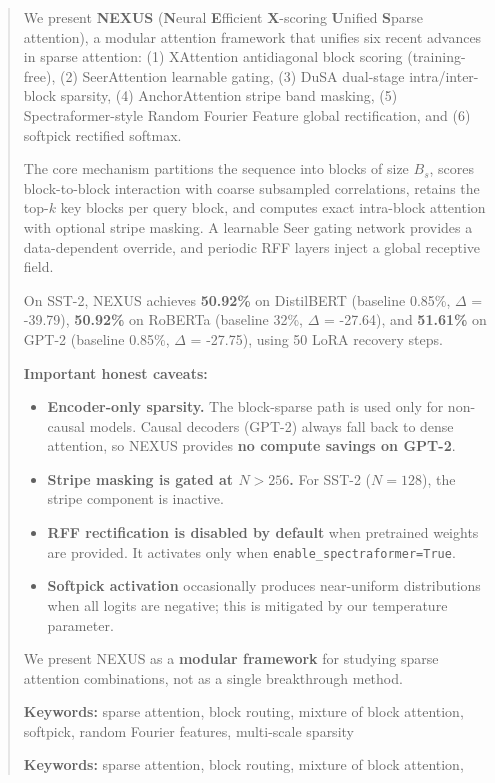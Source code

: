 \documentclass[10pt,twocolumn,letterpaper]{article}
\begin{document}
\maketitle

\begin{abstract}
We present \textbf{NEXUS} (\textbf{N}eural \textbf{E}fficient \textbf{X}-scoring \textbf{U}nified \textbf{S}parse 
attention), a modular attention framework that unifies six recent advances in 
sparse attention: (1) XAttention antidiagonal block scoring (training-free), 
(2) SeerAttention learnable gating, (3) DuSA dual-stage intra/inter-block 
sparsity, (4) AnchorAttention stripe band masking, (5) Spectraformer-style 
Random Fourier Feature global rectification, and (6) softpick rectified softmax.

The core mechanism partitions the sequence into blocks of size $B_s$, scores 
block-to-block interaction with coarse subsampled correlations, retains the 
top-$k$ key blocks per query block, and computes exact intra-block attention 
with optional stripe masking. A learnable Seer gating network provides a 
data-dependent override, and periodic RFF layers inject a global receptive 
field.

On SST-2, NEXUS achieves \textbf{50.92\%} on DistilBERT (baseline 0.85\%, 
$\Delta$ = -39.79), \textbf{50.92\%} on RoBERTa (baseline 32\%, $\Delta$ = -27.64), 
and \textbf{51.61\%} on GPT-2 (baseline 0.85\%, $\Delta$ = -27.75), using 
50 LoRA recovery steps.

\textbf{Important honest caveats:}

\begin{itemize}
\item \textbf{Encoder-only sparsity.} The block-sparse path is used only for
  non-causal models. Causal decoders (GPT-2) always fall back to dense
  attention, so NEXUS provides \textbf{no compute savings on GPT-2}.
\item \textbf{Stripe masking is gated at $N > 256$.} For SST-2 ($N = 128$), the stripe
  component is inactive.
\item \textbf{RFF rectification is disabled by default} when pretrained weights are
  provided. It activates only when \texttt{enable\_spectraformer=True}.
\item \textbf{Softpick activation} occasionally produces near-uniform distributions
  when all logits are negative; this is mitigated by our temperature
  parameter.

\end{itemize}
We present NEXUS as a \textbf{modular framework} for studying sparse attention 
combinations, not as a single breakthrough method.

\textbf{Keywords:} sparse attention, block routing, mixture of block attention, 
softpick, random Fourier features, multi-scale sparsity



\vspace{0.5em}
\noindent\textbf{Keywords:} sparse attention, block routing, mixture of block attention,
\end{abstract}
\end{document}
